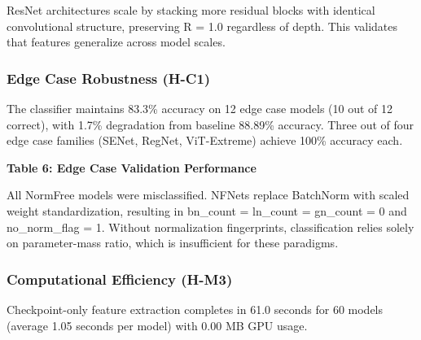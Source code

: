 ResNet architectures scale by stacking more residual blocks with identical convolutional structure, preserving R = 1.0 regardless of depth. This validates that features generalize across model scales.

\subsubsection{Edge Case Robustness (H-C1)}

The classifier maintains 83.3\% accuracy on 12 edge case models (10 out of 12 correct), with 1.7\% degradation from baseline 88.89\% accuracy. Three out of four edge case families (SENet, RegNet, ViT-Extreme) achieve 100\% accuracy each.

\textbf{Table 6: Edge Case Validation Performance}

\begin{table}[htbp]
\centering
{}
\end{table}

All NormFree models were misclassified. NFNets replace BatchNorm with scaled weight standardization, resulting in bn\_count = ln\_count = gn\_count = 0 and no\_norm\_flag = 1. Without normalization fingerprints, classification relies solely on parameter-mass ratio, which is insufficient for these paradigms.

\subsubsection{Computational Efficiency (H-M3)}

Checkpoint-only feature extraction completes in 61.0 seconds for 60 models (average 1.05 seconds per model) with 0.00 MB GPU usage.

